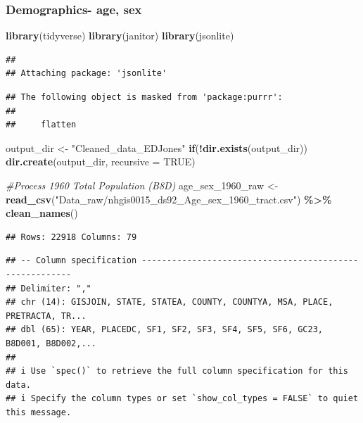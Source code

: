 \documentclass[
]{article}
\newenvironment{Shaded}{\begin{snugshade}}{\end{snugshade}}
\newcommand{\AttributeTok}[1]{\textcolor[rgb]{0.13,0.29,0.53}{#1}}
\newcommand{\CommentTok}[1]{\textcolor[rgb]{0.56,0.35,0.01}{\textit{#1}}}
\newcommand{\ConstantTok}[1]{\textcolor[rgb]{0.56,0.35,0.01}{#1}}
\newcommand{\ControlFlowTok}[1]{\textcolor[rgb]{0.13,0.29,0.53}{\textbf{#1}}}
\newcommand{\FunctionTok}[1]{\textcolor[rgb]{0.13,0.29,0.53}{\textbf{#1}}}
\newcommand{\NormalTok}[1]{#1}
\newcommand{\OtherTok}[1]{\textcolor[rgb]{0.56,0.35,0.01}{#1}}
\newcommand{\SpecialCharTok}[1]{\textcolor[rgb]{0.81,0.36,0.00}{\textbf{#1}}}
\newcommand{\StringTok}[1]{\textcolor[rgb]{0.31,0.60,0.02}{#1}}
\begin{document}
\subsubsection{Demographics- age, sex}\label{demographics--age-sex}

\begin{Shaded}
\begin{Highlighting}[]
\FunctionTok{library}\NormalTok{(tidyverse)}
\FunctionTok{library}\NormalTok{(janitor)}
\FunctionTok{library}\NormalTok{(jsonlite)}
\end{Highlighting}
\end{Shaded}

\begin{verbatim}
## 
## Attaching package: 'jsonlite'
\end{verbatim}

\begin{verbatim}
## The following object is masked from 'package:purrr':
## 
##     flatten
\end{verbatim}

\begin{Shaded}
\begin{Highlighting}[]
\NormalTok{output\_dir }\OtherTok{\textless{}{-}} \StringTok{"Cleaned\_data\_EDJones"}
\ControlFlowTok{if}\NormalTok{(}\SpecialCharTok{!}\FunctionTok{dir.exists}\NormalTok{(output\_dir)) }\FunctionTok{dir.create}\NormalTok{(output\_dir, }\AttributeTok{recursive =} \ConstantTok{TRUE}\NormalTok{)}

\CommentTok{\#Process 1960 Total Population (B8D) }
\NormalTok{age\_sex\_1960\_raw }\OtherTok{\textless{}{-}} \FunctionTok{read\_csv}\NormalTok{(}\StringTok{"Data\_raw/nhgis0015\_ds92\_Age\_sex\_1960\_tract.csv"}\NormalTok{) }\SpecialCharTok{\%\textgreater{}\%}
  \FunctionTok{clean\_names}\NormalTok{()}
\end{Highlighting}
\end{Shaded}

\begin{verbatim}
## Rows: 22918 Columns: 79
\end{verbatim}

\begin{verbatim}
## -- Column specification --------------------------------------------------------
## Delimiter: ","
## chr (14): GISJOIN, STATE, STATEA, COUNTY, COUNTYA, MSA, PLACE, PRETRACTA, TR...
## dbl (65): YEAR, PLACEDC, SF1, SF2, SF3, SF4, SF5, SF6, GC23, B8D001, B8D002,...
## 
## i Use `spec()` to retrieve the full column specification for this data.
## i Specify the column types or set `show_col_types = FALSE` to quiet this message.
\end{verbatim}
\end{document}
